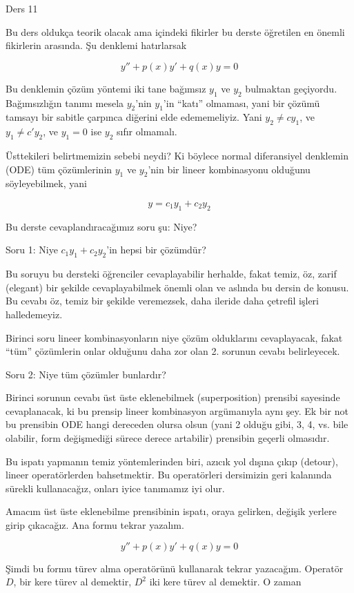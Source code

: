 \documentclass[12pt,fleqn]{article}\usepackage{../../common}
\begin{document}
Ders 11

Bu ders oldukça teorik olacak ama içindeki fikirler bu derste öğretilen en
önemli fikirlerin arasında. Şu denklemi hatırlarsak

$$ y'' + p(x)y' + q(x)y = 0 $$

Bu denklemin çözüm yöntemi iki tane bağımsız $y_1$ ve $y_2$ bulmaktan
geçiyordu. Bağımsızlığın tanımı mesela $y_2$'nin $y_1$'in ``katı''
olmaması, yani bir çözümü tamsayı bir sabitle çarpınca diğerini elde
edememeliyiz. Yani $y_2 \ne cy_1$, ve $y_1 \ne c'y_2$, ve $y_1 = 0$ ise
$y_2$ sıfır olmamalı. 

Üsttekileri belirtmemizin sebebi neydi? Ki böylece normal diferansiyel denklemin
(ODE) tüm çözümlerinin $y_1$ ve $y_2$'nin bir lineer kombinasyonu olduğunu
söyleyebilmek, yani

$$ y = c_1 y_1 + c_2 y_2 $$

Bu derste cevaplandıracağımız soru şu: Niye? 

Soru 1: Niye $c_1 y_1 + c_2 y_2$'in hepsi bir çözümdür?

Bu soruyu bu dersteki öğrenciler cevaplayabilir herhalde, fakat temiz, öz,
zarif (elegant) bir şekilde cevaplayabilmek önemli olan ve aslında bu
dersin de konusu. Bu cevabı öz, temiz bir şekilde veremezsek, daha ileride
daha çetrefil işleri halledemeyiz. 

Birinci soru lineer kombinasyonların niye çözüm olduklarını cevaplayacak,
fakat ``tüm'' çözümlerin onlar olduğunu daha zor olan 2. sorunun cevabı
belirleyecek.

Soru 2: Niye tüm çözümler bunlardır?

Birinci sorunun cevabı üst üste eklenebilmek (superposition) prensibi sayesinde
cevaplanacak, ki bu prensip lineer kombinasyon argümanıyla aynı şey. Ek bir not
bu prensibin ODE hangi dereceden olursa olsun (yani 2 olduğu gibi, 3, 4,
vs. bile olabilir, form değişmediği sürece derece artabilir) prensibin geçerli
olmasıdır.

Bu ispatı yapmanın temiz yöntemlerinden biri, azıcık yol dışına çıkıp
(detour), lineer operatörlerden bahsetmektir. Bu operatörleri dersimizin
geri kalanında sürekli kullanacağız, onları iyice tanımamız iyi olur. 

Amacım üst üste eklenebilme prensibinin ispatı, oraya gelirken, değişik
yerlere girip çıkacağız. Ana formu tekrar yazalım. 

$$ y'' + p(x)y' + q(x)y = 0 $$

Şimdi bu formu türev alma operatörünü kullanarak tekrar yazacağım. Operatör
$D$, bir kere türev al demektir, $D^2$ iki kere türev al demektir. O zaman
\end{document}
